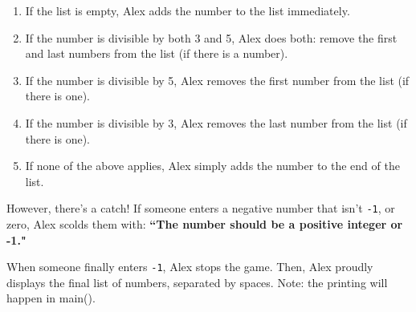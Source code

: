 \begin{enumerate}
    \item If the list is empty, Alex adds the number to the list immediately.
    \item If the number is divisible by both 3 and 5, Alex does both: remove the first and last numbers from the list (if there is a number). 
    \item If the number is divisible by 5, Alex removes the first number from the list (if there is one).
    \item If the number is divisible by 3, Alex removes the last number from the list (if there is one).
    \item If none of the above applies, Alex simply adds the number to the end of the list.
\end{enumerate}

However, there's a catch! If someone enters a negative number that isn't \verb|-1|, or zero, Alex scolds them with:  
\textbf{``The number should be a positive integer or -1."}

When someone finally enters \verb|-1|, Alex stops the game. Then, Alex proudly displays the final list of numbers, separated by spaces. Note: the printing will happen in main(). 

